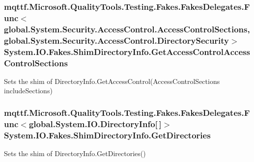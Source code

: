 \hypertarget{class_system_1_1_i_o_1_1_fakes_1_1_shim_directory_info_a0b2658fb648a752f7631d33967ad4c04}{
\subsubsection[{Get\-Access\-Control\-Access\-Control\-Sections}]{\setlength{\rightskip}{0pt plus 5cm}mqttf.\-Microsoft.\-Quality\-Tools.\-Testing.\-Fakes.\-Fakes\-Delegates.\-Func$<$global.\-System.\-Security.\-Access\-Control.\-Access\-Control\-Sections, global.\-System.\-Security.\-Access\-Control.\-Directory\-Security$>$ System.\-I\-O.\-Fakes.\-Shim\-Directory\-Info.\-Get\-Access\-Control\-Access\-Control\-Sections\hspace{0.3cm}{\ttfamily [set]}}}\label{class_system_1_1_i_o_1_1_fakes_1_1_shim_directory_info_a0b2658fb648a752f7631d33967ad4c04}


Sets the shim of Directory\-Info.\-Get\-Access\-Control(\-Access\-Control\-Sections include\-Sections)

\hypertarget{class_system_1_1_i_o_1_1_fakes_1_1_shim_directory_info_a9fe25e9e013dcabb799ba608c55bb4a2}{
\subsubsection[{Get\-Directories}]{\setlength{\rightskip}{0pt plus 5cm}mqttf.\-Microsoft.\-Quality\-Tools.\-Testing.\-Fakes.\-Fakes\-Delegates.\-Func$<$global.\-System.\-I\-O.\-Directory\-Info\mbox{[}$\,$\mbox{]}$>$ System.\-I\-O.\-Fakes.\-Shim\-Directory\-Info.\-Get\-Directories\hspace{0.3cm}{\ttfamily [set]}}}\label{class_system_1_1_i_o_1_1_fakes_1_1_shim_directory_info_a9fe25e9e013dcabb799ba608c55bb4a2}


Sets the shim of Directory\-Info.\-Get\-Directories()

